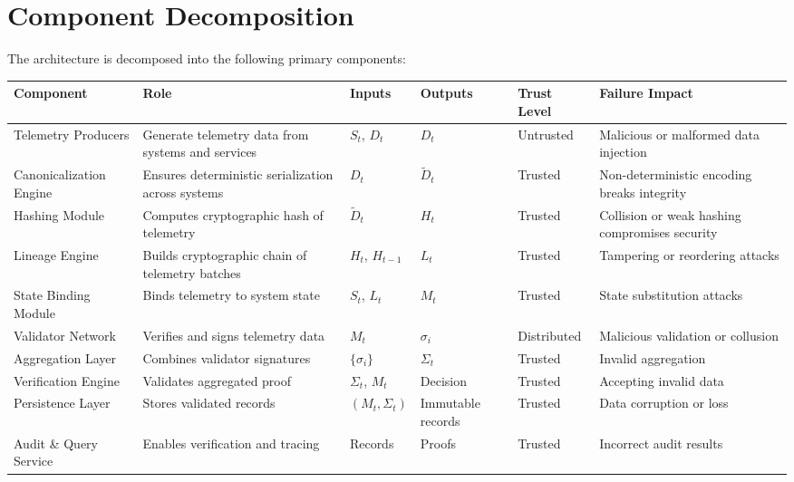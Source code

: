 \section{Component Decomposition}

The architecture is decomposed into the following primary components:

\begin{tabularx}{\textwidth}{|p{2.5cm}|X|X|X|p{2cm}|X|}
\hline
\textbf{Component} & \textbf{Role} & \textbf{Inputs} & \textbf{Outputs} & \textbf{Trust Level} & \textbf{Failure Impact} \\
\hline

Telemetry Producers & Generate telemetry data from systems and services & $S_t$, $D_t$ & $D_t$ & Untrusted & Malicious or malformed data injection \\

\hline

Canonicalization Engine & Ensures deterministic serialization across systems & $D_t$ & $\tilde{D}_t$ & Trusted & Non-deterministic encoding breaks integrity \\

\hline

Hashing Module & Computes cryptographic hash of telemetry & $\tilde{D}_t$ & $H_t$ & Trusted & Collision or weak hashing compromises security \\

\hline

Lineage Engine & Builds cryptographic chain of telemetry batches & $H_t$, $H_{t-1}$ & $L_t$ & Trusted & Tampering or reordering attacks \\

\hline

State Binding Module & Binds telemetry to system state & $S_t$, $L_t$ & $M_t$ & Trusted & State substitution attacks \\

\hline

Validator Network & Verifies and signs telemetry data & $M_t$ & $\sigma_i$ & Distributed & Malicious validation or collusion \\

\hline

Aggregation Layer & Combines validator signatures & $\{\sigma_i\}$ & $\Sigma_t$ & Trusted & Invalid aggregation \\

\hline

Verification Engine & Validates aggregated proof & $\Sigma_t$, $M_t$ & Decision & Trusted & Accepting invalid data \\

\hline

Persistence Layer & Stores validated records & $(M_t, \Sigma_t)$ & Immutable records & Trusted & Data corruption or loss \\

\hline

Audit \& Query Service & Enables verification and tracing & Records & Proofs & Trusted & Incorrect audit results \\

\hline
\end{tabularx}


